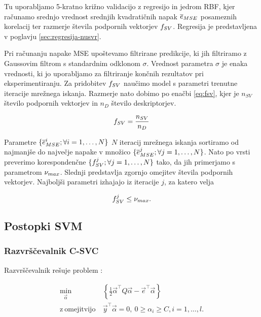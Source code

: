 {Tu uporabljamo 5-kratno križno validacijo z regresijo \nusvr in jedrom RBF, kjer računamo srednjo vrednost srednjih kvadratičnih napak $\overline{e}_{MSE}$ posameznih korelacij ter razmerje števila podpornih vektorjev $f_{SV}$. Regresija \nusvr je predstavljena v poglavju \ref{sec:regresija-nusvr}.

Pri računanju napake MSE upoštevamo filtrirane predikcije, ki jih filtriramo z Gaussovim filtrom s standardnim odklonom $\sigma$. Vrednost parametra $\sigma$ je enaka vrednosti, ki jo uporabljamo za filtriranje končnih rezultatov pri eksperimentiranju. Za pridobitev $f_{SV}$ naučimo model s parametri trenutne iteracije mrežnega iskanja. Razmerje nato dobimo po enačbi \eqref{eq:fsv}, kjer je $n_{SV}$ število podpornih vektorjev in $n_{D}$ število deskriptorjev.

\begin{equation}
f_{SV} = \frac{n_{SV}}{n_{D}}
\label{eq:fsv}
\end{equation}

Parametre $\{\overline{e}_{MSE}^{i};\forall i=1,\ldots,N\}$ $N$ iteracij mrežnega iskanja sortiramo od najmanjše do največje napake v množico $\{\overline{e}_{MSE}^{j};\forall j=1,\ldots,N\}$. Nato po vrsti preverimo korespondenčne $\{f_{SV}^{j};\forall j=1,\ldots,N\}$ tako, da jih primerjamo s parametrom $\nu_{max}$. Slednji predstavlja zgornjo omejitev števila podpornih vektorjev. Najboljši parametri izhajajo iz iteracije $j$, za katero velja 

\begin{equation}
f_{SV}^{j} \leq \nu_{max}.
\label{eq:numax}
\end{equation}


\subsection{Postopki SVM}
\subsubsection{Razvrščevalnik C-SVC}

Razvrščevalnik rešuje problem \cite{chang2011a}:

\begin{equation}\label{eq:c-svc}
\begin{aligned}
\min_{\vec{\alpha}} &~ \left\{ \frac{1}{2} \vec{\alpha}^\top Q \vec{\alpha} - \vec{e}^\top \vec{\alpha} \right\}\\
    \mathrm{z~omejitvijo} &~ \vec{y}^\top \vec{\alpha} = 0,~ 
    0 \geq \alpha_i \geq C, i=1, \ldots, l.
\end{aligned}	
\end{equation}

}
